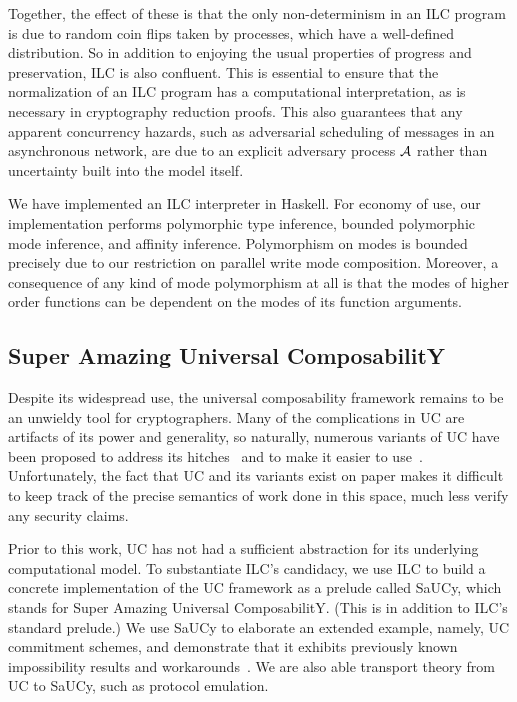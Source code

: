 Together, the effect of these is that the only non-determinism in an ILC program
is due to random coin flips taken by processes, which have a well-defined
distribution. So in addition to enjoying the usual properties of progress and
preservation, ILC is also confluent. This is essential to ensure that the
normalization of an ILC program has a computational interpretation, as is
necessary in cryptography reduction proofs.   This also guarantees
that any apparent concurrency hazards, such as adversarial scheduling of
messages in an asynchronous network, are due to an explicit adversary process
$\mathcal{{A}}$ rather than uncertainty built into the model itself.

We have implemented an ILC interpreter in Haskell. For economy of use, our
implementation performs polymorphic type inference, bounded polymorphic mode
inference, and affinity inference. Polymorphism on modes is bounded precisely
due to our restriction on parallel write mode composition. Moreover, a
consequence of any kind of mode polymorphism at all is that the modes of higher
order functions can be dependent on the modes of its function arguments.

\subsection{Super Amazing Universal ComposabilitY}

 Despite its widespread use, the universal
composability framework remains to be an unwieldy tool for cryptographers. Many
of the complications in UC are artifacts of its power and generality, so
naturally, numerous variants of UC have been proposed to address its
hitches~\cite{backes2007reactive, hofheinz2015gnuc, canetti2007universally,
  canetti2003universal} and to make it easier to
use~\cite{canetti2015simpler}. Unfortunately, the fact that UC and its variants
exist on paper makes it difficult to keep track of the precise semantics of work
done in this space, much less verify any security claims.

Prior to this work, UC has not had a sufficient abstraction for its underlying
computational model. To substantiate ILC's candidacy, we use ILC to build a
concrete implementation of the UC framework as a prelude called SaUCy, which
stands for Super Amazing Universal ComposabilitY. (This is in addition to ILC's
standard prelude.) We use SaUCy to elaborate an extended example, namely, UC
commitment schemes, and demonstrate that it exhibits previously known
impossibility results and workarounds~\cite{canetti2001commitments}. We are also
able transport theory from UC to SaUCy, such as protocol emulation.

